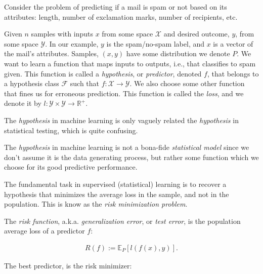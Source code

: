\documentclass[]{book}
\theoremstyle{definition}
\theoremstyle{definition}
\theoremstyle{definition}
\theoremstyle{remark}
\let\BeginKnitrBlock\begin \let\EndKnitrBlock\end
\begin{document}
\BeginKnitrBlock{example}[Rental Prices]
\protect\hypertarget{exm:rental-prices}{}{\label{exm:rental-prices}
{} }Consider the problem of predicting if a
mail is spam or not based on its attributes: length, number of
exclamation marks, number of recipients, etc.
\EndKnitrBlock{example}

Given \(n\) samples with inputs \(x\) from some space \(\mathcal{X}\)
and desired outcome, \(y\), from some space \(\mathcal{Y}\). In our
example, \(y\) is the spam/no-spam label, and \(x\) is a vector of the
mail's attributes. Samples, \((x,y)\) have some distribution we denote
\(P\). We want to learn a function that maps inputs to outputs, i.e.,
that classifies to spam given. This function is called a
\emph{hypothesis}, or \emph{predictor}, denoted \(f\), that belongs to a
hypothesis class \(\mathcal{F}\) such that
\(f:\mathcal{X} \to \mathcal{Y}\). We also choose some other function
that fines us for erroneous prediction. This function is called the
\emph{loss}, and we denote it by
\(l:\mathcal{Y}\times \mathcal{Y} \to \mathbb{R}^+\).

\BeginKnitrBlock{remark}
{}The \emph{hypothesis} in machine learning is
only vaguely related the \emph{hypothesis} in statistical testing, which
is quite confusing.
\EndKnitrBlock{remark}

\BeginKnitrBlock{remark}
{}The \emph{hypothesis} in machine learning is
not a bona-fide \emph{statistical model} since we don't assume it is the
data generating process, but rather some function which we choose for
its good predictive performance.
\EndKnitrBlock{remark}

The fundamental task in supervised (statistical) learning is to recover
a hypothesis that minimizes the average loss in the sample, and not in
the population. This is know as the \emph{risk minimization problem}.

\BeginKnitrBlock{definition}[Risk Function]
\protect\hypertarget{def:unnamed-chunk-185}{}{\label{def:unnamed-chunk-185}
{} }The \emph{risk function}, a.k.a.
\emph{generalization error}, or \emph{test error}, is the population
average loss of a predictor \(f\):

\begin{align}
  R(f):=\mathbb{E}_P[l(f(x),y)].
\end{align}
\EndKnitrBlock{definition}

The best predictor, is the risk minimizer:
\end{document}
